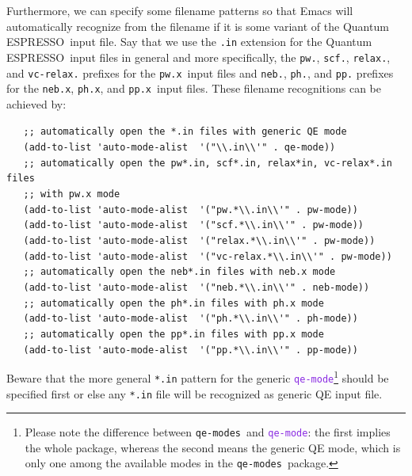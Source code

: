 \documentclass[12pt,a4paper]{article}
\def\qe{{\sc Quantum ESPRESSO}}
\def\pwx{\texttt{pw.x}}
\def\phx{\texttt{ph.x}}
\def\ppx{\texttt{pp.x}}
\def\nebx{\texttt{neb.x}}
\def\qemodes{\texttt{qe-modes}}
\def\efn#1{\textcolor{BlueViolet}{\texttt{#1}}}
\def\qemode{\efn{qe-mode}}
\begin{document}
Furthermore, we can specify some filename patterns so that Emacs will
automatically recognize from the filename if it is some variant of the
\qe\ input file.
%
Say that we use the \verb+.in+ extension for the \qe\ input files in
general and more specifically, the \texttt{pw.}, \texttt{scf.},
\texttt{relax.}, and \texttt{vc-relax.} prefixes for the \pwx\ input files
and \texttt{neb.}, \texttt{ph.},  and \texttt{pp.} prefixes for the
\nebx, \phx, and \ppx\ input files. These filename recognitions can be
achieved by:
\begin{flushleft}
{\color{red}
\verb+   ;; automatically open the *.in files with generic QE mode+}\\
\verb+   (add-to-list 'auto-mode-alist  '("\\.in\\'" . qe-mode))+\\[1em]
{\color{red}
\verb+   ;; automatically open the pw*.in, scf*.in, relax*in, vc-relax*.in files+\\
\verb+   ;; with pw.x mode+}\\
\verb+   (add-to-list 'auto-mode-alist  '("pw.*\\.in\\'" . pw-mode))+\\
\verb+   (add-to-list 'auto-mode-alist  '("scf.*\\.in\\'" . pw-mode))+\\
\verb+   (add-to-list 'auto-mode-alist  '("relax.*\\.in\\'" . pw-mode))+\\
\verb+   (add-to-list 'auto-mode-alist  '("vc-relax.*\\.in\\'" . pw-mode))+\\[1em]
{\color{red}
\verb+   ;; automatically open the neb*.in files with neb.x mode+}\\
\verb+   (add-to-list 'auto-mode-alist  '("neb.*\\.in\\'" . neb-mode))+\\[1em]
{\color{red}
\verb+   ;; automatically open the ph*.in files with ph.x mode+}\\
\verb+   (add-to-list 'auto-mode-alist  '("ph.*\\.in\\'" . ph-mode))+\\[1em]
{\color{red}
\verb+   ;; automatically open the pp*.in files with pp.x mode+}\\
\verb+   (add-to-list 'auto-mode-alist  '("pp.*\\.in\\'" . pp-mode))+\\[1em]
\end{flushleft}
Beware that the more general \texttt{*.in} pattern for the generic
\qemode\footnote{Please note the difference between \qemodes\ and
  \qemode: the first implies the whole package, whereas the second
  means the generic QE mode, which is only one among the available
  modes in the \qemodes\ package.} should be specified first
or else any \texttt{*.in} file will be recognized as generic QE input
file.
\end{document}
